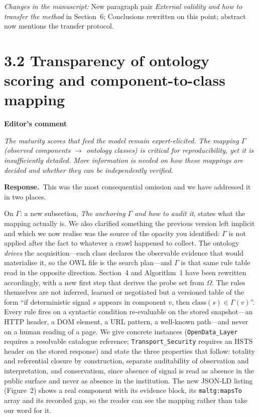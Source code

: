 \documentclass[11pt,a4paper]{article}
\newenvironment{comment}[1]
  {\par\vspace{6pt}\noindent\textbf{#1}\par\vspace{2pt}%
   \begin{mdframed}[backgroundcolor=cmtbg, linecolor=cmtrule, linewidth=0.6pt,
     innertopmargin=5pt, innerbottommargin=5pt, innerleftmargin=7pt,
     innerrightmargin=7pt, skipabove=2pt, skipbelow=5pt]\itshape}
  {\end{mdframed}}
\newcommand{\respuesta}{\par\noindent\textbf{Response.}\ }
\newcommand{\changed}[1]{\par\vspace{3pt}\noindent\textit{Changes in the manuscript:} #1\par}
\begin{document}
\changed{New paragraph pair \emph{External validity and how to transfer the method} in Section~6; Conclusions rewritten on this point; abstract now mentions the transfer protocol.}

\section*{3.2 Transparency of ontology scoring and component-to-class mapping}

\begin{comment}{Editor's comment}
The maturity scores that feed the model remain expert-elicited. The mapping $\Gamma$ (observed components $\rightarrow$ ontology classes) is critical for reproducibility, yet it is insufficiently detailed. More information is needed on how these mappings are decided and whether they can be independently verified.
\end{comment}

\respuesta This was the most consequential omission and we have addressed it in two places.

On $\Gamma$: a new subsection, \emph{The anchoring $\Gamma$ and how to audit it}, states what the mapping actually is. We also clarified something the previous version left implicit and which we now realise was the source of the opacity you identified: $\Gamma$ is not applied after the fact to whatever a crawl happened to collect. The ontology \emph{drives} the acquisition---each class declares the observable evidence that would materialise it, so the OWL file is the search plan---and $\Gamma$ is that same rule table read in the opposite direction. Section~4 and Algorithm~1 have been rewritten accordingly, with a new first step that derives the probe set from $\Omega$. The rules themselves are not inferred, learned or negotiated but a versioned table of the form ``if deterministic signal $s$ appears in component $v$, then $\mathrm{class}(s)\in\Gamma(v)$''. Every rule fires on a syntactic condition re-evaluable on the stored snapshot---an HTTP header, a DOM element, a URL pattern, a well-known path---and never on a human reading of a page. We give concrete instances (\texttt{OpenData\_Layer} requires a resolvable catalogue reference; \texttt{Transport\_Security} requires an HSTS header on the stored response) and state the three properties that follow: totality and referential closure by construction, separate auditability of observation and interpretation, and conservatism, since absence of signal is read as absence in the public surface and never as absence in the institution. The new JSON-LD listing (Figure~2) shows a real component with its evidence block, its \texttt{maltg:mapsTo} array and its recorded gap, so the reader can see the mapping rather than take our word for it.
\end{document}
